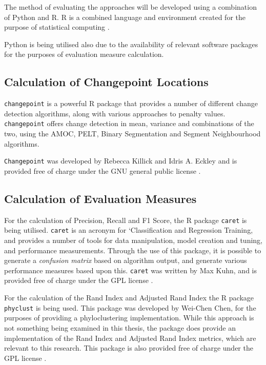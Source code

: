 \documentclass{uvamscse}	%
\begin{document}
The method of evaluating the approaches will be developed using a combination of Python and \textsf{R}. \textsf{R} is a combined language and environment created for the purpose of statistical computing \cite{RCoreTeam2017}.

Python is being utilised also due to the availability of relevant software packages for the purposes of evaluation measure calculation.

\subsection{Calculation of Changepoint Locations}

\texttt{changepoint} is a powerful R package that provides a number of different change detection algorithms, along with various approaches to penalty values. \texttt{changepoint} offers change detection in mean, variance and combinations of the two, using the AMOC, PELT, Binary Segmentation and Segment Neighbourhood algorithms.

\texttt{Changepoint} was developed by Rebecca Killick and Idris A. Eckley and is provided free of charge under the GNU general public license \cite{Killick2014}.

\subsection{Calculation of Evaluation Measures}

For the calculation of Precision, Recall and F1 Score, the \textsf{R} package \texttt{caret} is being utilised. \texttt{caret} is an acronym for `Classification and Regression Training, and provides a number of tools for data manipulation, model creation and tuning, and performance measurements. Through the use of this package, it is possible to generate a \emph{confusion matrix} based on algorithm output, and generate various performance measures based upon this. \texttt{caret} was written by Max Kuhn, and is provided free of charge under the GPL license \cite{FromJedWing2017}.

For the calculation of the Rand Index and Adjusted Rand Index the \textsf{R} package \texttt{phyclust} is being used. This package was developed by Wei-Chen Chen, for the purposes of providing a phyloclustering implementation. While this approach is not something being examined in this thesis, the package does provide an implementation of the Rand Index and Adjusted Rand Index metrics, which are relevant to this research. This package is also provided free of charge under the GPL license \cite{Chen2011}.
\end{document}
